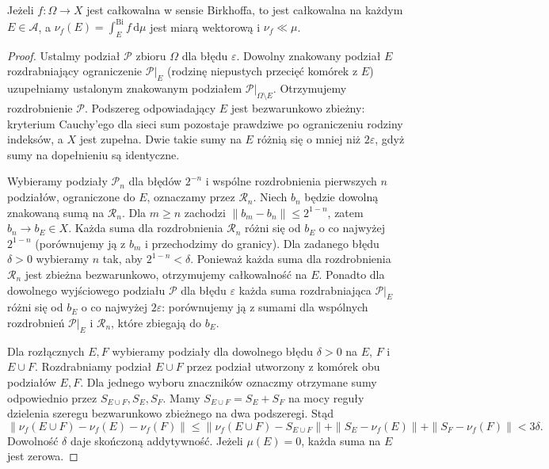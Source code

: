 \begin{twierdzenie}
\label{thm:birkhoff-measure-30}
Jeżeli $f:\Omega\to X$ jest całkowalna w sensie Birkhoffa,
to jest całkowalna na każdym $E\in\mathcal A$, a
$\nu_f(E)=\int_E^{\mathrm{Bi}}f\,\mathrm d\mu$
jest miarą wektorową i $\nu_f\ll\mu$.
\end{twierdzenie}
\begin{proof}
Ustalmy podział $\mathcal P$ zbioru $\Omega$ dla błędu
$\varepsilon$. Dowolny znakowany podział $E$ rozdrabniający
ograniczenie $\mathcal P|_E$ (rodzinę niepustych przecięć
komórek z $E$) uzupełniamy ustalonym znakowanym
podziałem $\mathcal P|_{\Omega\setminus E}$.
Otrzymujemy rozdrobnienie $\mathcal P$.
Podszereg odpowiadający $E$ jest bezwarunkowo zbieżny:
kryterium Cauchy'ego dla sieci sum pozostaje prawdziwe
po ograniczeniu rodziny indeksów, a $X$ jest zupełna.
Dwie takie sumy na $E$ różnią się o mniej niż
$2\varepsilon$, gdyż sumy na dopełnieniu są identyczne.

Wybieramy podziały $\mathcal P_n$ dla błędów $2^{-n}$
i wspólne rozdrobnienia pierwszych $n$ podziałów,
ograniczone do $E$, oznaczamy przez $\mathcal R_n$.
Niech $b_n$ będzie dowolną znakowaną sumą na
$\mathcal R_n$. Dla $m\ge n$ zachodzi
$\|b_m-b_n\|\le2^{1-n}$, zatem $b_n\to b_E\in X$.
Każda suma dla rozdrobnienia $\mathcal R_n$
różni się od $b_E$ o co najwyżej $2^{1-n}$
(porównujemy ją z $b_m$ i przechodzimy do granicy).
Dla zadanego błędu $\delta>0$ wybieramy $n$
tak, aby $2^{1-n}<\delta$. Ponieważ każda suma
dla rozdrobnienia $\mathcal R_n$ jest zbieżna
bezwarunkowo, otrzymujemy całkowalność na $E$.
Ponadto dla dowolnego wyjściowego podziału $\mathcal P$
dla błędu $\varepsilon$ każda suma rozdrabniająca
$\mathcal P|_E$ różni się od $b_E$ o co najwyżej
$2\varepsilon$: porównujemy ją z sumami dla wspólnych
rozdrobnień $\mathcal P|_E$ i $\mathcal R_n$,
które zbiegają do $b_E$.

Dla rozłącznych $E,F$ wybieramy podziały dla dowolnego
błędu $\delta>0$ na $E$, $F$ i $E\cup F$.
Rozdrabniamy podział $E\cup F$ przez podział
utworzony z komórek obu podziałów $E,F$.
Dla jednego wyboru znaczników oznaczmy otrzymane
sumy odpowiednio przez $S_{E\cup F},S_E,S_F$.
Mamy $S_{E\cup F}=S_E+S_F$ na mocy reguły
dzielenia szeregu bezwarunkowo zbieżnego na
dwa podszeregi. Stąd
\[
 \|\nu_f(E\cup F)-\nu_f(E)-\nu_f(F)\|
 \le\|\nu_f(E\cup F)-S_{E\cup F}\|
 +\|S_E-\nu_f(E)\|+\|S_F-\nu_f(F)\|<3\delta.
\]
Dowolność $\delta$ daje skończoną addytywność.
Jeżeli $\mu(E)=0$, każda suma na $E$ jest zerowa.


\end{proof}
